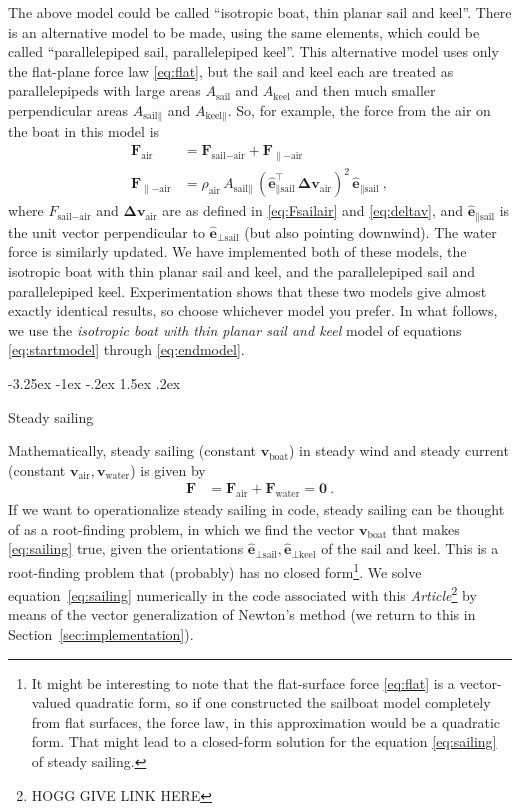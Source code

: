 \documentclass[letterpaper]{article}
\makeatletter
\renewcommand{\vec}[1]{\boldsymbol{#1}}
\newcommand{\uvec}{\vec{\hat{e}}}
\newcommand{\air}{\text{air}}
\newcommand{\water}{\text{water}}
\newcommand{\boat}{\text{boat}}
\newcommand{\sail}{\text{sail}}
\newcommand{\keel}{\text{keel}}
\newcommand{\vair}{\vec{v}_\air}
\newcommand{\vwater}{\vec{v}_\water}
\newcommand{\vboat}{\vec{v}_\boat}
\newcommand{\documentname}{\textsl{Article}}
\newcommand{\secref}[1]{Section~\ref{#1}}
\renewcommand\section{\@startsection {section}{1}{\z@}%
  {-3.25ex \@plus -1ex \@minus -.2ex}%
  {1.5ex \@plus .2ex}%
  {\raggedright\normalfont\large\bfseries}}
\makeatother
\begin{document}
The above model could be called ``isotropic boat, thin planar sail and keel''.
There is an alternative model to be made, using the same elements, which could be called ``parallelepiped sail, parallelepiped keel''.
This alternative model uses only the flat-plane force law \eqref{eq:flat}, but the sail and keel each are treated as parallelepipeds with large areas $A_\sail$ and $A_\keel$ and then much smaller perpendicular areas $A_{\sail\parallel}$ and $A_{\keel\parallel}$.
So, for example, the force from the air on the boat in this model is
\begin{align}
  \vec{F}_\air &= \vec{F}_{\sail-\air} + \vec{F}_{\parallel-\air}
  \\
  \vec{F}_{\parallel-\air} & = \rho_\air\,A_{\sail\parallel}\,(\uvec_{\parallel\sail}^\top\,\vec{\Delta v}_\air)^2\,\uvec_{\parallel\sail}
   ~,
\end{align}
where $F_{\sail-\air}$ and $\vec{\Delta v}_\air$ are as defined in \eqref{eq:Fsailair} and \eqref{eq:deltav}, and $\uvec_{\parallel\sail}$ is the unit vector perpendicular to $\uvec_{\perp\sail}$ (but also pointing downwind).
The water force is similarly updated.
We have implemented both of these models, the isotropic boat with thin planar sail and keel, and the parallelepiped sail and parallelepiped keel.
Experimentation shows that these two models give almost exactly identical results, so choose whichever model you prefer.
In what follows, we use the \emph{isotropic boat with thin planar sail and keel} model of equations \eqref{eq:startmodel} through \eqref{eq:endmodel}.

\section{Steady sailing}\label{sec:steady}

Mathematically, steady sailing (constant $\vboat$) in steady wind and steady current (constant $\vair, \vwater$) is given by
\begin{align}\label{eq:sailing}
    \vec{F} &= \vec{F}_\air + \vec{F}_\water = \vec{0} ~.
\end{align}
If we want to operationalize steady sailing in code, steady sailing can be thought of as a root-finding problem, in which we find the vector $\vboat$ that makes \eqref{eq:sailing} true, given the orientations $\uvec_{\perp\sail}, \uvec_{\perp\keel}$ of the sail and keel.
This is a root-finding problem that (probably) has no closed form\footnote{%
It might be interesting to note that the flat-surface force \eqref{eq:flat} is a vector-valued quadratic form, so if one constructed the sailboat model completely from flat surfaces, the force law, in this approximation would be a quadratic form.
That might lead to a closed-form solution for the equation \eqref{eq:sailing} of steady sailing.}.
We solve equation~\eqref{eq:sailing} numerically in the code associated with this \documentname\footnote{%
HOGG GIVE LINK HERE}
by means of the vector generalization of Newton's method (we return to this in \secref{sec:implementation}).
\end{document}
